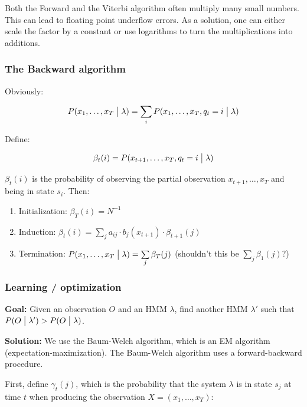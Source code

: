\documentclass[11pt]{article}
\begin{document}
Both the Forward and the Viterbi algorithm often multiply many small numbers. This can lead to floating point underflow errors. As a solution, one can either scale the factor by a constant or use logarithms to turn the multiplications into additions.

\subsubsection{The Backward algorithm}

Obviously:

\begin{equation}
    P(x_1, \ldots, x_T \bigm| \lambda) = \sum\limits_i P(x_1, \ldots, x_T, q_t = i \bigm| \lambda)
\end{equation}

Define:

\begin{equation}
    \beta_t(i) = P(x_{t+1}, \ldots, x_T, q_t = i \bigm| \lambda)
\end{equation}

\vspace{10pt}

$\beta_t(i)$ is the probability of observing the partial observation $x_{t+1}, \ldots, x_T$ and being in state $s_i$. Then:

\begin{enumerate}
    \item Initialization: $\beta_T(i) = N^{-1}$
    \item Induction: $\beta_t(i) = \sum\limits_j a_{ij} \cdot b_j(x_{t+1}) \cdot \beta_{t+1}(j)$
    \item Termination: $P(x_1, \ldots, x_T \bigm| \lambda) = \sum\limits_j \beta_T(j)$ (shouldn't this be $\sum\limits_j \beta_1(j)$?)
\end{enumerate}

\subsubsection{Learning / optimization}

\textbf{Goal:} Given an observation $O$ and an HMM $\lambda$, find another HMM $\lambda'$ such that $P(O \bigm| \lambda') > P(O \bigm| \lambda)$.

\textbf{Solution:} We use the Baum-Welch algorithm, which is an EM algorithm (expectation-maximization). The Baum-Welch algorithm uses a forward-backward procedure.

First, define $\gamma_t(j)$, which is the probability that the system $\lambda$ is in state $s_j$ at time $t$ when producing the observation $X = (x_1, \ldots, x_T)$:
\end{document}
